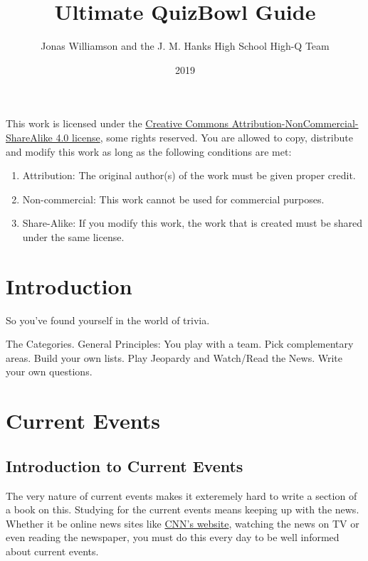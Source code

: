 \documentclass[12pt]{book}
\begin{document}
	\frontmatter
	\title{Ultimate QuizBowl Guide}
	\author{Jonas Williamson and the  J. M. Hanks High School High-Q Team}
	\date{2019}
	\maketitle
	\begin{center}

			\huge \cc \the\year
			\vspace{0.5 in}
			
			\byncsa
	\normalsize
		\end{center}
		\vspace{2 in}	
	This work is licensed under the \href{https://creativecommons.org/licenses/by-nc-sa/4.0/legalcode}{Creative Commons Attribution-NonCommercial-ShareAlike 4.0 license}, some rights reserved.  You are allowed to copy, distribute and modify this work as long as the following conditions are met:
	\begin{enumerate}
		\item Attribution: The original author(s) of the work must be given proper credit.
		\item Non-commercial: This work cannot be used for commercial purposes.
		\item Share-Alike: If you modify this work, the work that is created must be shared under the same license. 
	\end{enumerate}


	
	
	
	
	
	
	\tableofcontents

	\mainmatter
	
	
\chapter{Introduction}
So you've found yourself in the world of trivia.  

The Categories.
General Principles: You play with a team.  Pick complementary areas.  Build your own lists.  Play Jeopardy and Watch/Read the News.  Write your own questions.

\chapter{Current Events}
	\section{Introduction to Current Events}
		The very nature of current events makes it exteremely hard to write a section of a book on this.  Studying for the current events means keeping up with the news.  Whether it be online news sites like \href{http://www.cnn.com}{CNN's website}, watching the news on TV or even reading the newspaper, you must do this every day to be well informed about current events.  
		
\end{document}
